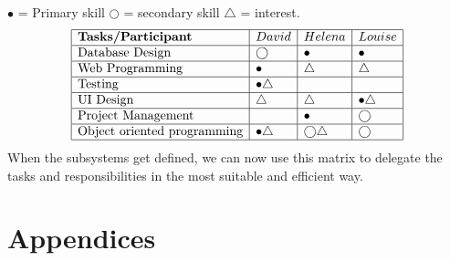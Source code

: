 \documentclass[12pt]{article}
\begin{document}
$\bullet$ = Primary skill \quad $\bigcirc$ = secondary skill \quad $\bigtriangleup$ = interest.
\[
\begin{array}{|l|l|l|l|}
\hline
\textbf{Tasks/Participant} & David & Helena & Louise\\
\hline
\text{Database Design} & \bigcirc & \bullet & \bullet\\
\hline
\text{Web Programming} & \bullet & \bigtriangleup & \bigtriangleup\\
\hline
\text{Testing} & \bullet \bigtriangleup & & \\
\hline
\text{UI Design} & \bigtriangleup & \bigtriangleup & \bullet \bigtriangleup\\
\hline
\text{Project Management} & & \bullet & \bigcirc\\
\hline
\text{Object oriented programming} & \bullet \bigtriangleup& \bigcirc \bigtriangleup & \bigcirc \\
\hline
\end{array}
\]
When the subsystems get defined, we can now use this matrix to delegate the tasks and responsibilities in the most suitable and efficient way.
\section{Appendices}
\end{document}
